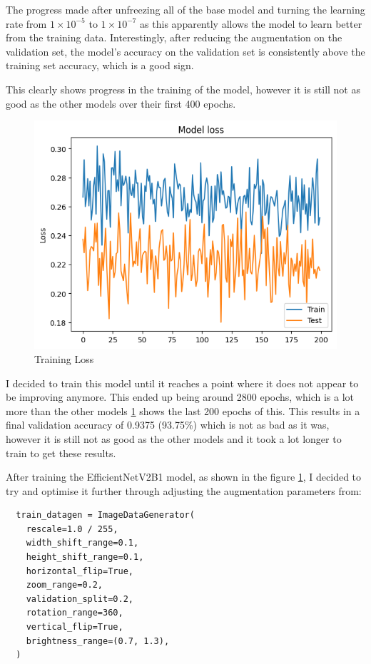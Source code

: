 \documentclass[]{final_report}
\begin{document}
The progress made after unfreezing all of the base model and turning the learning rate from $1 \times 10^{-5}$ to $1 \times 10^{-7}$ as this apparently allows the model to learn better from the training data. Interestingly, after reducing the augmentation on the validation set, the model's accuracy on the validation set is consistently above the training set accuracy, which is a good sign.

This clearly shows progress in the training of the model, however it is still not as good as the other models over their first 400 epochs. 

\begin{figure}[ht!]
  \centering
  \includegraphics[width=0.7\linewidth]{images/EfficientNetV2B1-final-training-accuracy.png}
  \caption{Training Loss}
  \label{fig:EfficientNetV2B1-final-training-loss}
\end{figure}

I decided to train this model until it reaches a point where it does not appear to be improving anymore. This ended up being around 2800 epochs, which is a lot more than the other models \ref{fig:EfficientNetV2B1-final-training-loss} shows the last 200 epochs of this. This results in a final validation accuracy of 0.9375 (93.75\%) which is not as bad as it was, however it is still not as good as the other models and it took a lot longer to train to get these results.

\clearpage
After training the EfficientNetV2B1 model, as shown in the figure \ref{fig:EfficientNetV2B1-final-training-loss}, I decided to try and optimise it further through adjusting the augmentation parameters from:

\begin{lstlisting}
  train_datagen = ImageDataGenerator(
    rescale=1.0 / 255,
    width_shift_range=0.1,
    height_shift_range=0.1,
    horizontal_flip=True,
    zoom_range=0.2,
    validation_split=0.2,
    rotation_range=360,
    vertical_flip=True,
    brightness_range=(0.7, 1.3),
  )
\end{lstlisting}
\end{document}
